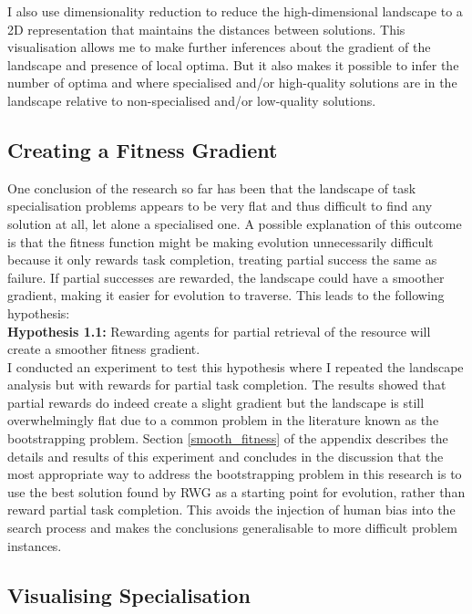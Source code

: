 \documentclass[12pt]{article}
\begin{document}
I also use dimensionality reduction to reduce the high-dimensional landscape to a 2D representation that maintains the distances between solutions.
This visualisation allows me to make further inferences about the gradient of the landscape and presence of local optima.
But it also makes it possible to infer the number of optima and where specialised and/or high-quality solutions are in the landscape relative to non-specialised and/or low-quality solutions.\\

\subsection{Creating a Fitness Gradient}

One conclusion of the research so far has been that the landscape of task specialisation problems appears to be very flat and thus difficult to find any solution at all, let alone a specialised one.
A possible explanation of this outcome is that the fitness function might be making evolution unnecessarily difficult because it only rewards task completion, treating partial success the same as failure.
If partial successes are rewarded, the landscape could have a smoother gradient, making it easier for evolution to traverse.
This leads to the following hypothesis:\\

\textbf{Hypothesis 1.1:} Rewarding agents for partial retrieval of the resource will create a smoother fitness gradient.\\

I conducted an experiment to test this hypothesis where I repeated the landscape analysis but with rewards for partial task completion.
The results showed that partial rewards do indeed create a slight gradient but the landscape is still overwhelmingly flat due to a common problem in the literature known as the bootstrapping problem.
Section \ref{smooth_fitness} of the appendix describes the details and results of this experiment and concludes in the discussion that the most appropriate way to address the bootstrapping problem in this research is to use the best solution found by RWG as a starting point for evolution, rather than reward partial task completion. This avoids the injection of human bias into the search process and makes the conclusions generalisable to more difficult problem instances.

\subsection{Visualising Specialisation}\label{visualising_specialisation}
\end{document}
